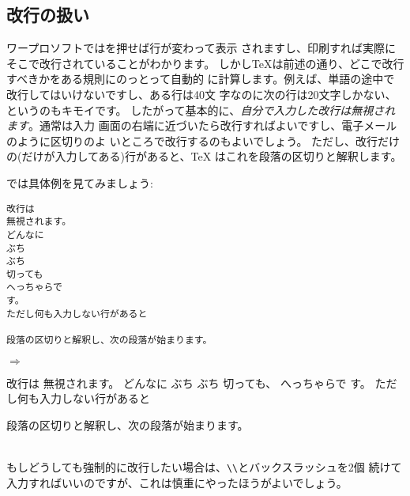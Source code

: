 \subsection{改行の扱い}
ワープロソフトではを押せば行が変わって表示
されますし、印刷すれば実際にそこで改行されていることがわかります。
しかし{\TeX}は前述の通り、どこで改行すべきかをある規則にのっとって自動的
に計算します。例えば、単語の途中で改行してはいけないですし、ある行は40文
字なのに次の行は20文字しかない、というのもキモイです。
したがって基本的に、\emph{自分で入力した改行は無視されます}。通常は入力
画面の右端に近づいたら改行すればよいですし、電子メールのように区切りのよ
いところで改行するのもよいでしょう。
ただし、改行だけの(だけが入力してある)行があると、{\TeX}
はこれを段落の区切りと解釈します。

では具体例を見てみましょう: \\

\begin{minipage}[c]{.50\textwidth}
\begin{screen}
\small
\begin{verbatim}
改行は
無視されます。
どんなに
ぶち
ぶち
切っても
へっちゃらで
す。
ただし何も入力しない行があると

段落の区切りと解釈し、次の段落が始まります。
\end{verbatim}
\end{screen}
\end{minipage}%
$\Rightarrow$
\begin{minipage}{.45\textwidth}
\begin{shadebox}
改行は
無視されます。
どんなに
ぶち
ぶち
切っても、
へっちゃらで
す。
ただし何も入力しない行があると

段落の区切りと解釈し、次の段落が始まります。
\end{shadebox}
\end{minipage}
\vspace*{1mm}\\

もしどうしても強制的に改行したい場合は、\verb+\\+とバックスラッシュを2個
続けて入力すればいいのですが、これは慎重にやったほうがよいでしょう。

